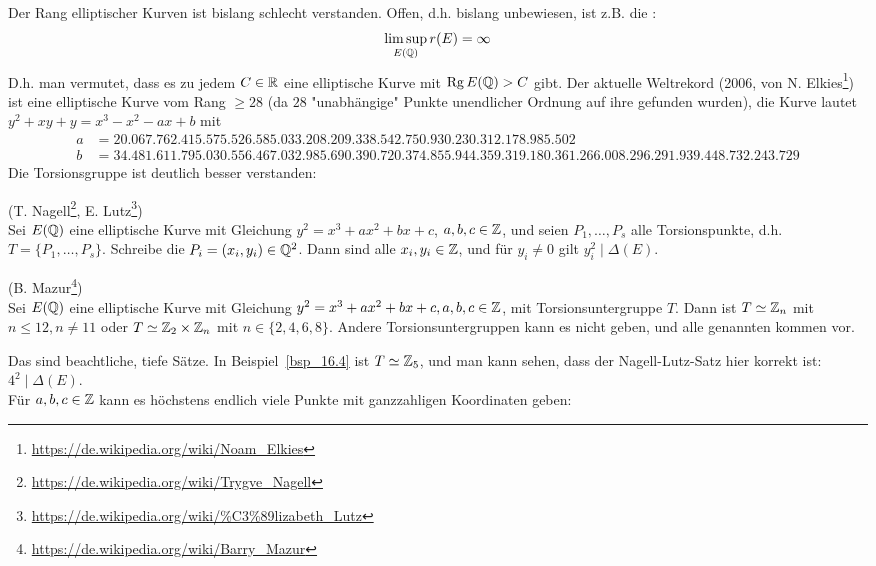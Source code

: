 \begin{bem}
	Der Rang elliptischer Kurven ist bislang schlecht verstanden.
	Offen, d.h. bislang unbewiesen, ist z.B. die :
	\[
		\limsup_{E(\mathbb{Q})} r(E) = \infty
	\]
	D.h. man vermutet, dass es zu jedem $C \in \mathbb{R}$ eine elliptische Kurve mit $\operatorname{Rg} E(\mathbb{Q}) > C$ gibt.
	Der aktuelle Weltrekord (2006, von N. Elkies\footnote{\url{https://de.wikipedia.org/wiki/Noam\_Elkies}}) ist eine elliptische Kurve vom Rang $\geq 28$ (da $28$ "unabhängige" Punkte unendlicher Ordnung auf ihre gefunden wurden), die Kurve lautet $y^2 + xy + y = x^3 - x^2 - ax + b$ mit
	\footnotesize
	\begin{equation}
	\begin{aligned}
		a &= 20.067.762.415.575.526.585.033.208.209.338.542.750.930.230.312.178.985.502 \\
		b &= 34.481.611.795.030.556.467.032.985.690.390.720.374.855.944.359.319.180.361.266.008.296.291.939.448.732.243.729
	\end{aligned}
	\end{equation}
	\normalsize
	Die Torsionsgruppe ist deutlich besser verstanden:
\end{bem}

\begin{satz}
	(T. Nagell\footnote{\url{https://de.wikipedia.org/wiki/Trygve_Nagell}}, E. Lutz\footnote{\url{https://de.wikipedia.org/wiki/\%C3\%89lizabeth_Lutz}}) \\
	Sei $E(\mathbb{Q})$ eine elliptische Kurve mit Gleichung $y^2 = x^3 + ax^2 + bx + c$, $a,b,c \in \mathbb{Z}$, und seien $P_1,\dots,P_s$ alle Torsionspunkte, d.h. $T = \{P_1,\dots,P_s\}$.
	Schreibe die $P_i = (x_i,y_i) \in \mathbb{Q}^2$.
	Dann sind alle $x_i,y_i \in \mathbb{Z}$, und für $y_i \neq 0$ gilt $y_i^2 \mid \Delta(E)$. 
\end{satz}

\begin{satz}
	(B. Mazur\footnote{\url{https://de.wikipedia.org/wiki/Barry_Mazur}}) \\
	Sei $E(\mathbb{Q})$ eine elliptische Kurve mit Gleichung $y^2 = x^3 + ax^2 + bx + c, a,b,c \in \mathbb{Z}$, mit Torsionsuntergruppe $T$.
	Dann ist $T \simeq \mathbb{Z}_n$ mit $n \leq 12, n \neq 11$ oder $T \simeq \mathbb{Z}_2 \times \mathbb{Z}_n$ mit $n \in \{2,4,6,8\}$.
	Andere Torsionsuntergruppen kann es nicht geben, und alle genannten kommen vor. 
\end{satz}

Das sind beachtliche, tiefe Sätze.
In Beispiel~\ref{bsp_16.4} ist $T \simeq \mathbb{Z}_5$, und man kann sehen, dass der Nagell-Lutz-Satz hier korrekt ist: $4^2 \mid \Delta(E)$. \\
Für $a,b,c \in \mathbb{Z}$ kann es höchstens endlich viele Punkte mit ganzzahligen Koordinaten geben:

